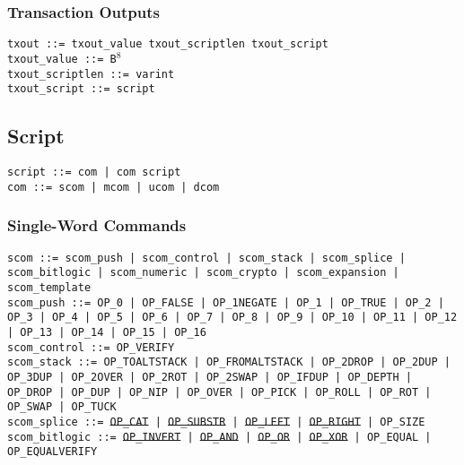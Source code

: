 \documentclass{article}
\begin{document}
\subsubsection{Transaction Outputs}
\noindent
\texttt{txout ::= txout\_value txout\_scriptlen txout\_script  } \\
\texttt{txout\_value ::= B$^8$} \\
\texttt{txout\_scriptlen ::= varint} \\
\texttt{txout\_script ::= script}

\subsection{Script}
\noindent
\texttt{script ::= com | com script} \\
\texttt{com ::= scom | mcom | ucom | dcom}

\subsubsection{Single-Word Commands}
\noindent \hangindent=0.7cm
\texttt{scom ::=
  scom\_push | scom\_control | scom\_stack | scom\_splice | scom\_bitlogic |
  scom\_numeric | scom\_crypto | scom\_expansion | scom\_template} \\

\noindent \hangindent=0.7cm
\texttt{scom\_push ::=
  OP\_0 | OP\_FALSE | OP\_1NEGATE | OP\_1 | OP\_TRUE |
  OP\_2 | OP\_3 | OP\_4 | OP\_5 | OP\_6 | OP\_7 | OP\_8 | OP\_9 | OP\_10 |
  OP\_11 | OP\_12 | OP\_13 | OP\_14 | OP\_15 | OP\_16} \\

\noindent \hangindent=0.7cm
\texttt{scom\_control ::= OP\_VERIFY} \\

\noindent \hangindent=0.7cm
\texttt{scom\_stack ::=
  OP\_TOALTSTACK | OP\_FROMALTSTACK | OP\_2DROP | OP\_2DUP | OP\_3DUP |
  OP\_2OVER | OP\_2ROT | OP\_2SWAP | OP\_IFDUP | OP\_DEPTH | OP\_DROP | OP\_DUP
  | OP\_NIP | OP\_OVER | OP\_PICK | OP\_ROLL | OP\_ROT | OP\_SWAP | OP\_TUCK}
  \\

\noindent \hangindent=0.7cm
\texttt{scom\_splice ::=
  \sout{OP\_CAT }| \sout{OP\_SUBSTR} | \sout{OP\_LEFT} | \sout{OP\_RIGHT} |
  OP\_SIZE} \\

\noindent \hangindent=0.7cm
\texttt{scom\_bitlogic ::=
  \sout{OP\_INVERT} | \sout{OP\_AND} | \sout{OP\_OR} | \sout{OP\_XOR} |
  OP\_EQUAL | OP\_EQUALVERIFY} \\
\end{document}
